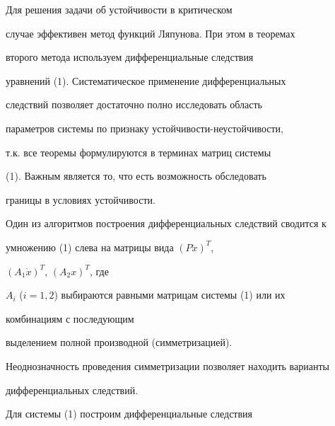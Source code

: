 Для решения задачи об устойчивости в критическом


случае эффективен метод функций Ляпунова. При этом в теоремах


второго метода используем дифференциальные следствия


уравнений (1). Систематическое применение дифференциальных


следствий позволяет достаточно полно исследовать область


параметров системы по признаку устойчивости-неустойчивости,


т.к. все теоремы формулируются в терминах матриц системы


(1). Важным является то, что есть возможность обследовать


границы в условиях устойчивости.





Один из алгоритмов построения дифференциальных следствий сводится к


умножению (1) слева на матрицы вида $ (P\ddot x)^{T}$,


$(A_{1}\Dot x )^{T}$, $(A_{2}x)^{T}$, где


$A_{i}$ ($i=1,2$) выбираются равными матрицам системы (1) или их


комбинациям с последующим


выделением полной производной (симметризацией).


Неоднозначность проведения симметризации позволяет находить варианты


дифференциальных следствий.





Для системы (1) построим дифференциальные следствия


